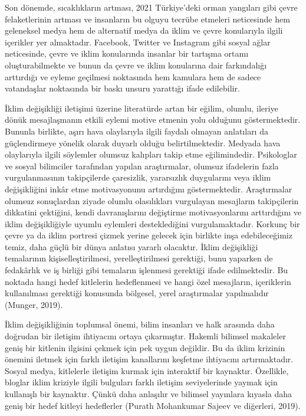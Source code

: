 \documentclass[
]{book}
\begin{document}
Son dönemde, sıcaklıkların artması, 2021 Türkiye'deki orman yangıları gibi çevre felaketlerinin artması ve insanların bu olguyu tecrübe etmeleri neticesinde hem geleneksel medya hem de alternatif medya da iklim ve çevre konularıyla ilgili içerikler yer almaktadır. Facebook, Twitter ve Instagram gibi sosyal ağlar neticesinde, çevre ve iklim konularında insanlar bir tartışma ortamı oluşturabilmekte ve bunun da çevre ve iklim konularına dair farkındalığı arttırdığı ve eyleme geçilmesi noktasında hem kamulara hem de sadece vatandaşlar noktasında bir baskı unsuru yarattığı ifade edilebilir.

İklim değişikliği iletişimi üzerine literatürde artan bir eğilim, olumlu, ileriye dönük mesajlaşmanın etkili eylemi motive etmenin yolu olduğunu göstermektedir. Bununla birlikte, aşırı hava olaylarıyla ilgili faydalı olmayan anlatıları da güçlendirmeye yönelik olarak duyarlı olduğu belirtilmektedir. Medyada hava olaylarıyla ilgili söylemler olumsuz kalıpları takip etme eğilimindedir. Psikologlar ve sosyal bilimciler tarafından yapılan araştırmalar, olumsuz ifadelerin fazla vurgulanmasının takipçilerde çaresizlik, yararsızlık duygularını veya iklim değişikliğini inkâr etme motivasyonunu artırdığını göstermektedir. Araştırmalar olumsuz sonuçlardan ziyade olumlu olasılıkları vurgulayan mesajların takipçilerin dikkatini çektiğini, kendi davranışlarını değiştirme motivasyonlarını arttırdığını ve iklim değişikliğiyle uyumlu eylemleri desteklediğini vurgulamaktadır. Korkunç bir çevre ya da iklim portresi çizmek yerine gelecek için birlikte inşa edebileceğimiz temiz, daha güçlü bir dünya anlatısı yararlı olacaktır. İklim değişikliği temalarının kişiselleştirilmesi, yerelleştirilmesi gerektiği, bunu yaparken de fedakârlık ve iş birliği gibi temaların işlenmesi gerektiği ifade edilmektedir. Bu noktada hangi hedef kitlelerin hedeflenmesi ve hangi özel mesajların, içeriklerin kullanılması gerektiği konusunda bölgesel, yerel araştırmalar yapılmalıdır (Munger, 2019).

İklim değişikliğinin toplumsal önemi, bilim insanları ve halk arasında daha doğrudan bir iletişim ihtiyacını ortaya çıkarmıştır. Hakemli bilimsel makaleler geniş bir kitlenin ilgisini çekmek için pek uygun değildir. Bu da iklim krizinin önemini iletmek için farklı iletişim kanallarını keşfetme ihtiyacını artırmaktadır. Sosyal medya, kitlelerle iletişim kurmak için interaktif bir kaynaktır. Özellikle, bloglar iklim kriziyle ilgili bulguları farklı iletişim seviyelerinde yaymak için kullanışlı bir kaynaktır. Çünkü daha anlaşılır ve bilimsel yayınlara kıyasla daha geniş bir hedef kitleyi hedeflerler (Purath Mohankumar Sajeev ve diğerleri, 2019).
\end{document}
